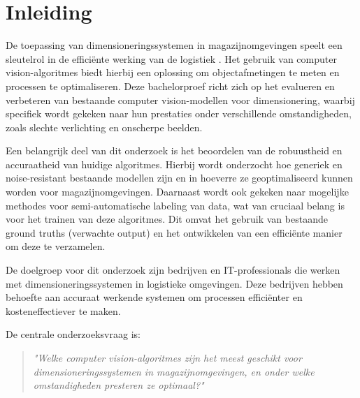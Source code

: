 
\section{Inleiding}
\label{sec:inleiding}

De toepassing van dimensioneringssystemen in magazijnomgevingen speelt een sleutelrol in de efficiënte werking van de logistiek \autocite{Cornell2015} \autocite{FreightSnap2019}. Het gebruik van computer vision-algoritmes biedt hierbij een oplossing om objectafmetingen te meten en processen te optimaliseren. Deze bachelorproef richt zich op het evalueren en verbeteren van bestaande computer vision-modellen voor dimensionering, waarbij specifiek wordt gekeken naar hun prestaties onder verschillende omstandigheden, zoals slechte verlichting en onscherpe beelden.

Een belangrijk deel van dit onderzoek is het beoordelen van de robuustheid en accuraatheid van huidige algoritmes. Hierbij wordt onderzocht hoe generiek en noise-resistant bestaande modellen zijn en in hoeverre ze geoptimaliseerd kunnen worden voor magazijnomgevingen. Daarnaast wordt ook gekeken naar mogelijke methodes voor semi-automatische labeling van data, wat van cruciaal belang is voor het trainen van deze algoritmes. Dit omvat het gebruik van bestaande ground truths (verwachte output) en het ontwikkelen van een efficiënte manier om deze te verzamelen.

De doelgroep voor dit onderzoek zijn bedrijven en IT-professionals die werken met dimensioneringssystemen in logistieke omgevingen. Deze bedrijven hebben behoefte aan accuraat werkende systemen om processen efficiënter en kosteneffectiever te maken.

De centrale onderzoeksvraag is:
\begin{quote}
    \emph{"Welke computer vision-algoritmes zijn het meest
    geschikt voor dimensioneringssystemen in
    magazijnomgevingen, en onder welke omstandigheden
    presteren ze optimaal?"}
\end{quote}

